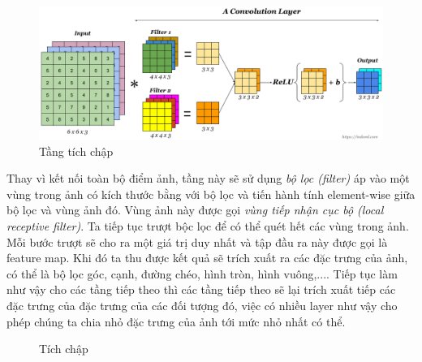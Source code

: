 \begin{figure}[H]
\begin{center}
\includegraphics[scale=0.3]{chap3/image/cnn/cnn3.png}
    \caption{Tầng tích chập \protect \footnotemark}
    \label{fig:conv_layer}
\end{center}
\end{figure}
Thay vì kết nối toàn bộ điểm ảnh, tầng này sẽ sử dụng \textit{bộ lọc (filter)} áp vào một vùng trong ảnh có kích thước bằng với bộ lọc và tiến hành tính element-wise giữa bộ lọc và vùng ảnh đó. Vùng ảnh này được gọi \textit{vùng tiếp nhận cục bộ (local receptive filter)}. Ta tiếp tục trượt bộc lọc để có thể quét hết các vùng trong ảnh. Mỗi bước trượt sẽ cho ra một giá trị duy nhất và tập đầu ra này được gọi là feature map. Khi đó ta thu được kết quả sẽ trích xuất ra các đặc trưng của ảnh, có thể là bộ lọc góc, cạnh, đường chéo, hình tròn, hình vuông,.... Tiếp tục làm như vậy cho các tầng tiếp theo thì các tầng tiếp theo sẽ lại trích xuất tiếp các đặc trưng của đặc trưng của các đối tượng đó, việc có nhiều layer như vậy cho phép chúng ta chia nhỏ đặc trưng của ảnh tới mức nhỏ nhất có thể.

\begin{figure}[H]
\begin{center}
\hspace{0.3cm}
\end{center}
\caption{Tích chập \protect \footnotemark}
\label{fig:cnn_operation}
\end{figure}
